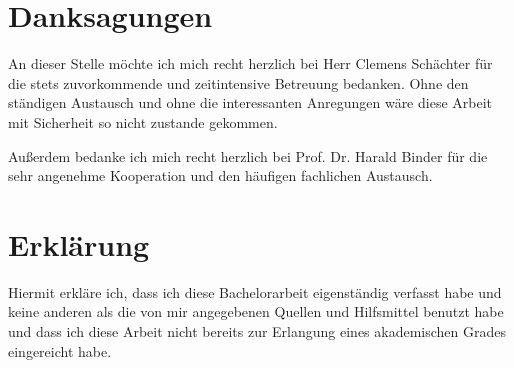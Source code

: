\documentclass[%
thesis=student,%
coverpage=false,%
titlepage=false,%
headmarks=true, %
german,%
font=libertine, %
math=newpxtx, %
BCOR=5mm,%
coverBCOR=11mm%
]{tumbook}
\theoremstyle{break}
\begin{document}
\chapter{Danksagungen}
An dieser Stelle möchte ich mich recht herzlich bei Herr Clemens Schächter für die stets zuvorkommende und zeitintensive Betreuung bedanken. Ohne den ständigen Austausch und ohne die interessanten Anregungen wäre diese Arbeit mit Sicherheit so nicht zustande gekommen.

Außerdem bedanke ich mich recht herzlich bei Prof. Dr. Harald Binder für die sehr angenehme Kooperation und den häufigen fachlichen Austausch. 
\chapter{Erklärung}
Hiermit erkläre ich, dass ich diese Bachelorarbeit eigenständig verfasst habe und keine anderen als
die von mir angegebenen Quellen und Hilfsmittel benutzt habe und dass ich diese Arbeit nicht
bereits zur Erlangung eines akademischen Grades eingereicht habe.
\end{document}
